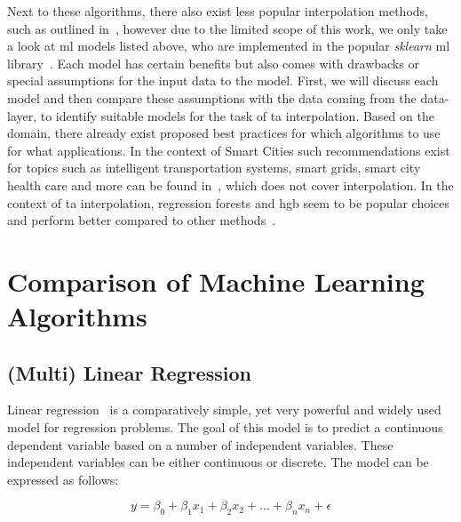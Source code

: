 Next to these algorithms, there also exist less popular interpolation methods, such as outlined in~\cite{li2014spatial}, however due to the limited scope of this work, we only take a look at \gls{ml} models listed above, who are implemented in the popular \textit{sklearn} \gls{ml} library~\cite{scikit-learn}.
Each model has certain benefits but also comes with drawbacks or special assumptions for the input data to the model. First, we will discuss each model and then compare these assumptions with the data coming from the data-layer, to identify suitable models for the task of \gls{ta} interpolation.
Based on the domain, there already exist proposed best practices for which algorithms to use for what applications. In the context of Smart Cities such recommendations exist for topics such as intelligent transportation systems, smart grids, smart city health care and more can be found in~\cite{ullah2020applications}, which does not cover interpolation. In the context of \gls{ta} interpolation, regression forests and \gls{hgb} seem to be popular choices and perform better compared to other methods~\cite{apaydin2022evaluation, ho2014mapping}.

\section{Comparison of Machine Learning Algorithms}
\label{sec:comparison ml algorithms}

\subsection{(Multi) Linear Regression}
\label{subsec: linear regression}

Linear regression~\cite{montgomery2021introduction} is a comparatively simple, yet very powerful and widely used model for regression problems. The goal of this model is to predict a continuous dependent variable based on a number of independent variables. These independent variables can be either continuous or discrete. The model can be expressed as follows:

\begin{equation}
    y = \beta_0 + \beta_1 x_1 + \beta_2 x_2 + ... + \beta_n x_n + \epsilon
\end{equation}

